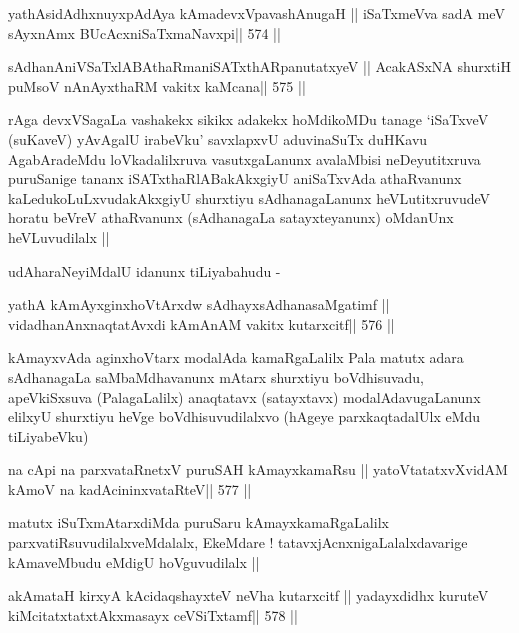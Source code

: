 \begin{shl}
yathAsidAdhxnuyxpAdAya kAmadevxVpavashAnugaH ||
iSaTxmeVva sadA meV sAyxnAmx BUcAcxniSaTxmaNavxpi\hfill || 574 ||
\end{shl}

\begin{shl}
sAdhanAniVSaTxlABAthaRmaniSATxthARpanutatxyeV ||
AcakASxNA shurxtiH puMsoV nAnAyxthaRM vakitx kaMcana\hfill || 575 ||
\end{shl}

\begin{artha}
rAga devxVSagaLa vashakekx sikikx adakekx hoMdikoMDu tanage `iSaTxveV
(suKaveV) yAvAgalU irabeVku' savxlapxvU aduvinaSuTx duHKavu
AgabAradeMdu loVkadalilxruva vasutxgaLanunx avalaMbisi neDeyutitxruva
puruSanige tananx iSATxthaRlABakAkxgiyU aniSaTxvAda athaRvanunx
kaLedukoLuLxvudakAkxgiyU shurxtiyu sAdhanagaLanunx heVLutitxruvudeV
horatu beVreV athaRvanunx (sAdhanagaLa satayxteyanunx) oMdanUnx
heVLuvudilalx ||

udAharaNeyiMdalU idanunx tiLiyabahudu -
\end{artha}

\begin{shl}
yathA kAmAyxginxhoVtArxdw sAdhayxsAdhanasaMgatimf ||
vidadhanAnxnaqtatAvxdi kAmAnAM vakitx kutarxcitf\hfill || 576 ||
\end{shl}

\begin{artha}
kAmayxvAda aginxhoVtarx modalAda kamaRgaLalilx Pala matutx adara
sAdhanagaLa saMbaMdhavanunx mAtarx shurxtiyu boVdhisuvadu,
apeVkiSxsuva (PalagaLalilx) anaqtatavx (satayxtavx) modalAdavugaLanunx
elilxyU shurxtiyu heVge boVdhisuvudilalxvo (hAgeye parxkaqtadalUlx
eMdu tiLiyabeVku)
\end{artha}

\begin{shl}
na cApi na parxvataRnetxV puruSAH kAmayxkamaRsu ||
yatoV\s tatatxvXvidAM kAmoV na kadAcininxvataRteV\hfill || 577 ||
\end{shl}

\begin{artha}
matutx iSuTxmAtarxdiMda puruSaru kAmayxkamaRgaLalilx
parxvatiRsuvudilalxveMdalalx, EkeMdare ! tatavxjAcnxnigaLalalxdavarige
kAmaveMbudu eMdigU hoVguvudilalx ||
\end{artha}

\begin{shl}
akAmataH kirxyA kAcidaqshayxteV neVha kutarxcitf ||
yadayxdidhx kuruteV kiMcitatxtatxtAkxmasayx ceVSiTxtamf\hfill || 578 ||
\end{shl}


